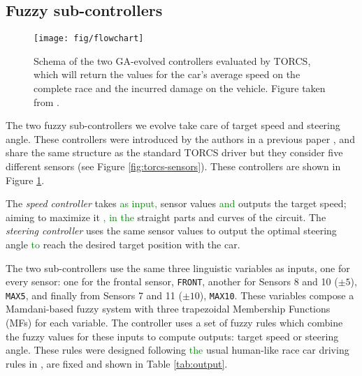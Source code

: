 \documentclass[10pt,journal,compsoc]{IEEEtran}
\begin{document}

\subsection{Fuzzy sub-controllers}
\label{subsec:fuzzy-controllers}

\begin{figure}[!ht]
  \begin{center}
    \texttt{[image: fig/flowchart]}
  \end{center}
  \caption{Schema of the two GA-evolved controllers evaluated by TORCS, which will
    return the values for the car's average speed on the complete race
    and the incurred damage on the vehicle. Figure taken from
    \cite{salem_evo18}.}
    \label{fig:ga}
\end{figure}
%
The two fuzzy sub-controllers we evolve take care of target speed and steering angle. These controllers were introduced by the authors in a previous paper \cite{salem_evo17}, and share the same structure as the standard TORCS driver but they consider five different sensors (see Figure \ref{fig:torcs-sensors}). These controllers are shown in Figure \ref{fig:ga}. 


The \textit{speed controller} takes \textcolor{green}{as input,} sensor values \textcolor{green}{and} outputs the target speed; aiming to maximize it \textcolor{green}{, in the} straight parts and curves of the circuit. The \textit{steering controller} uses the same sensor values to output the optimal steering angle \textcolor{green}{to} reach the desired target position with the car.

The two sub-controllers use the same three linguistic variables as
inputs, one for every sensor: one for the frontal sensor,
\texttt{FRONT}, another for Sensors 8 and 10 ($\pm 5$\textdegree),
\texttt{MAX5}, and finally from Sensors 7 and 11 ($\pm
10$\textdegree), \texttt{MAX10}. These variables compose a Mamdani-based fuzzy
system \cite{iancu2012} with three trapezoidal Membership Functions
(MFs) for each variable. The controller uses a set of fuzzy rules
which combine the fuzzy values for these inputs to compute outputs:
target speed or steering angle.
% 
These rules were designed following \textcolor{green}{the} usual human-like race car driving
rules in \cite{salem_evo18}, are fixed and shown in Table \ref{tab:output}.
\end{document}
